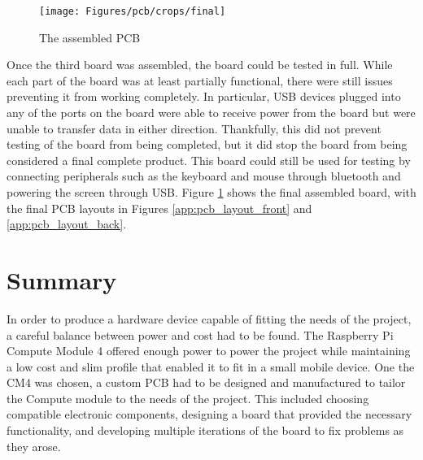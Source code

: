 \begin{figure}[!b]
  \centering
  \texttt{[image: Figures/pcb/crops/final]}
  \caption[Assembled PCB]{The assembled PCB}
  \label{fig:AssembledPCB}
\end{figure}

Once the third board was assembled, the board could be tested in full.
While each part of the board was at least partially functional, there were still issues preventing it from working completely.
In particular, USB devices plugged into any of the ports on the board were able to receive power from the board but were unable to transfer data in either direction.
Thankfully, this did not prevent testing of the board from being completed, but it did stop the board from being considered a final complete product.
This board could still be used for testing by connecting peripherals such as the keyboard and mouse through bluetooth and powering the screen through USB.
Figure \ref{fig:AssembledPCB} shows the final assembled board, with the final PCB layouts in Figures \ref{app:pcb_layout_front} and \ref{app:pcb_layout_back}.


\section{Summary}\label{sec:HardwareSummary}

In order to produce a hardware device capable of fitting the needs of the project, a careful balance between power and cost had to be found.
The Raspberry Pi Compute Module 4 offered enough power to power the project while maintaining a low cost and slim profile that enabled it to fit in a small mobile device.
One the CM4 was chosen, a custom PCB had to be designed and manufactured to tailor the Compute module to the needs of the project.
This included choosing compatible electronic components, designing a board that provided the necessary functionality, and developing multiple iterations of the board to fix problems as they arose.